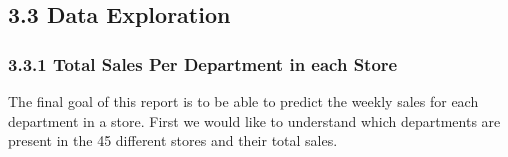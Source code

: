\documentclass[]{article}
\begin{document}
\pagebreak

\subsection{3.3 Data Exploration}\label{data-exploration}

\subsubsection{3.3.1 Total Sales Per Department in each
Store}\label{total-sales-per-department-in-each-store}

The final goal of this report is to be able to predict the weekly sales
for each department in a store. First we would like to understand which
departments are present in the 45 different stores and their total
sales.
\end{document}
